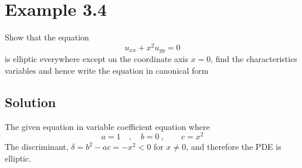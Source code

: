 \documentclass[11pt]{report}
\newcommand{\sps}{\\[0.2cm]}
\begin{document}
	\section*{Example 3.4}
	Show that the equation
	\begin{equation}
		u_{xx} + x^2u_{yy} = 0 \label{ex:3_4_1} \tag{1}
	\end{equation}
	is elliptic everywhere except on the coordinate axis $x=0$, find the characteristics variables and hence write the equation in canonical form
	
	\subsection*{Solution}
	The given equation in variable coefficient equation where
	\begin{equation}
		a=1\quad, \quad b=0~, \qquad c=x^2\label{ex:3_4_2} \tag{2}
	\end{equation}
	The discriminant, $\delta = b^2 - ac = -x^2 < 0$ for $x\neq 0$, and therefore the PDE is elliptic.\sps
	
\end{document}
